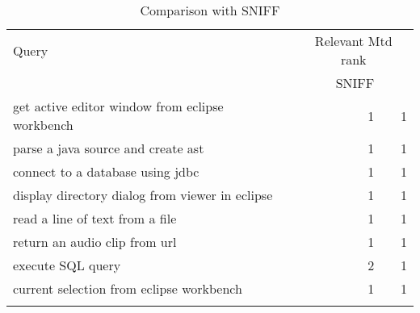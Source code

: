 \begin{table}
	\begin{center}	
		\caption{Comparison with SNIFF}
			\begin{tabular}{lrr}
				\topline
				\headcol Query	& \multicolumn{2}{c}{Relevant Mtd rank}\\
				\headcol 		& SNIFF	& \tool \\
				\midline 
				
				\rowcol get active editor window from eclipse workbench	& 1 & 1\\
				\rowpln parse a java source and create ast & 1 & 1\\
				\rowcol connect to a database using jdbc & 1 & 1\\
				\rowpln display directory dialog from viewer in eclipse & 1 & 1\\
				\rowcol read a line of text from a file & 1 & 1\\
				\rowpln return an audio clip from url & 1 & 1\\
				\rowcol execute SQL query & 2 & 1\\
				\rowpln current selection from eclipse workbench & 1 & 1\\ 
				\bottomline
			\end{tabular}
			\label{tab:SNIFFComp}
	\end{center}
\end{table}


